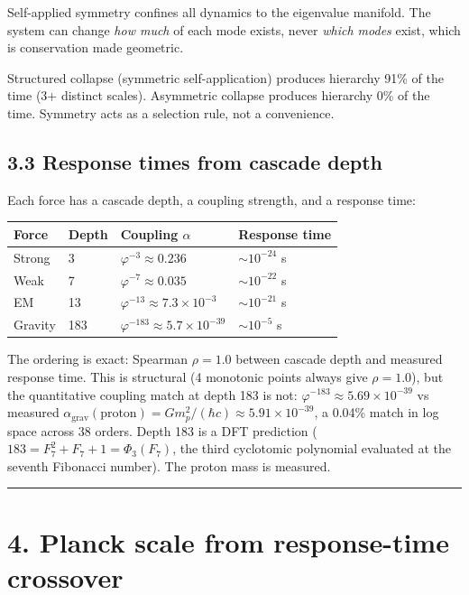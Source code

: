 \documentclass[11pt,a4paper]{article}
\begin{document}
Self-applied symmetry confines all dynamics to the eigenvalue manifold. The system can change \emph{how much} of each mode exists, never \emph{which modes} exist, which is conservation made geometric.

Structured collapse (symmetric self-application) produces hierarchy 91\% of the time (3+ distinct scales). Asymmetric collapse produces hierarchy 0\% of the time. Symmetry acts as a selection rule, not a convenience.

\subsection*{3.3 Response times from cascade depth}

Each force has a cascade depth, a coupling strength, and a response time:

\begin{longtable}[]{@{}llll@{}}
\toprule
Force & Depth & Coupling $\alpha$ & Response time \\
\midrule\endhead
Strong & 3 & $\varphi^{-3} \approx 0.236$ & $\sim 10^{-24}$ s \\
Weak & 7 & $\varphi^{-7} \approx 0.035$ & $\sim 10^{-22}$ s \\
EM & 13 & $\varphi^{-13} \approx 7.3 \times 10^{-3}$ & $\sim 10^{-21}$ s \\
Gravity & 183 & $\varphi^{-183} \approx 5.7 \times 10^{-39}$ & $\sim 10^{-5}$ s \\
\bottomrule
\end{longtable}

The ordering is exact: Spearman $\rho = 1.0$ between cascade depth and measured response time. This is structural (4 monotonic points always give $\rho = 1.0$), but the quantitative coupling match at depth 183 is not: $\varphi^{-183} \approx 5.69 \times 10^{-39}$ vs measured $\alpha_{\text{grav}}(\text{proton}) = G m_p^2 / (\hbar c) \approx 5.91 \times 10^{-39}$, a 0.04\% match in log space across 38 orders. Depth 183 is a DFT prediction ($183 = F_7^2 + F_7 + 1 = \Phi_3(F_7)$, the third cyclotomic polynomial evaluated at the seventh Fibonacci number). The proton mass is measured.

\begin{center}\rule{0.5\linewidth}{0.4pt}\end{center}

\section*{4. Planck scale from response-time crossover}
\end{document}
